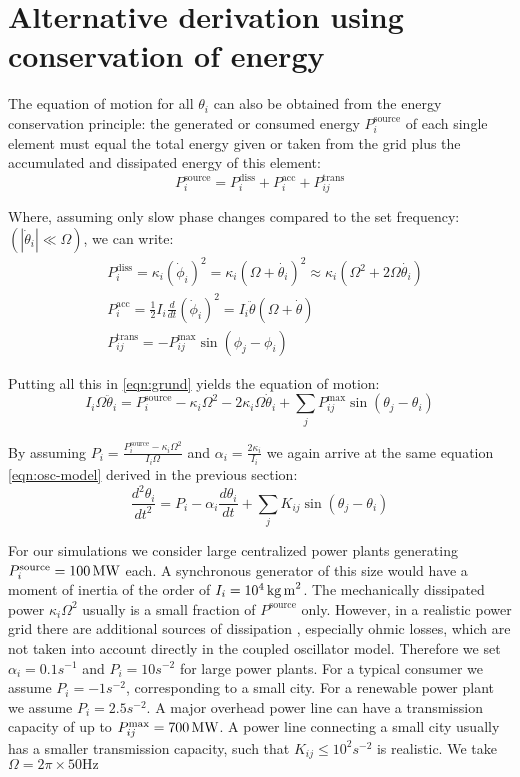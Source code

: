 \documentclass[10pt,aps,pra,twocolumn,superscriptaddress]{revtex4-1}
\begin{document}
\section{Alternative derivation using conservation of energy}
The equation of motion for all $\theta_i$ can also be obtained from the energy 
conservation principle: the generated or consumed energy
$P^{\text{source}}_i$ of each single element must equal the total energy given or taken from the grid plus the accumulated and dissipated energy of
this element:
\begin{equation}
P^{\text{source}}_i= P^{\text{diss}}_i+ P^{\text{acc}}_i+ P^{\text{trans}}_{ij}\label{eqn:grund}
\end{equation}

Where, assuming only slow phase changes compared to the set frequency: 
$(|\dot\theta_i| \ll\Omega)$, we can write:
\begin{align}
\label{form-powers}
&P^{\text{diss}}_i=\kappa_i(\dot\phi_i)^2=\kappa_i(\Omega+\dot{\theta_i})^2\approx\kappa_i(\Omega^2+2\Omega\dot{\theta_i})\\
&P^\text{acc}_i=\frac{1}{2}I_i\frac{d}{dt}(\dot\phi_i)^2 = I_i\ddot{\theta}(\Omega+\dot{\theta})\\
&P^{\text{trans}}_{ij}=   -P^{\text{max}}_{ij}\sin(\phi_j-\phi_i)
\end{align}

Putting all this in \eqref{eqn:grund} yields the equation of motion:
\begin{equation}
I_i\Omega\ddot\theta_i=P^{\text{source}}_i
     -\kappa_i\Omega^2-2\kappa_i\Omega\dot\theta_i+\sum_j P^{\text{max}}_{ij}\sin(\theta_j-\theta_i)
\end{equation}

By assuming
$P_i=\frac{P^{\text{source}}_i-\kappa_i \Omega^2}{I_i\Omega}$ and 
$\alpha_i=\frac{2 \kappa_i}{I_i}$ we again arrive at the same equation 
\eqref{eqn:osc-model} derived 
in the previous section:
\begin{equation}
\frac{d^2\theta_i}{dt^2}=P_i-\alpha_i\frac{d\theta_i}{dt}+\sum_j K_{ij}\sin(\theta_j-\theta_i)
\end{equation}

For our simulations we consider large centralized power plants generating $P^{\text{source}}_i = 100 \, {\rm MW}$ each. A synchronous generator of this
size would have a moment of inertia of the order of $I_i=10^4 \, {\rm kg \, m}^2$. The mechanically dissipated power $\kappa_i\Omega^2$ usually is a small
fraction of $P^{\text{source}}$ only. However, in a realistic power grid there are additional sources of dissipation 
\cite{Mach08}, especially ohmic losses, which
are not taken into account directly in the coupled oscillator model. Therefore we set
$\alpha_i=0.1 s^{-1}$ and $P_i = 10 s^{-2}$ for large power plants. For
a typical consumer we assume $P_i = -1 s^{-2}$, corresponding to a small city. For a renewable power plant we assume $P_i=2.5 s^{-2}$. A major overhead power line can
have a transmission capacity of up to $P^{\text{max}}_{ij} = 700 \, {\rm MW}$. A power line connecting a small city usually has a smaller transmission
capacity, such that $K_{ij} \le 10^2 s^{-2}$ is realistic. We take $\Omega = 2\pi\times 50\text{Hz}$
\end{document}
